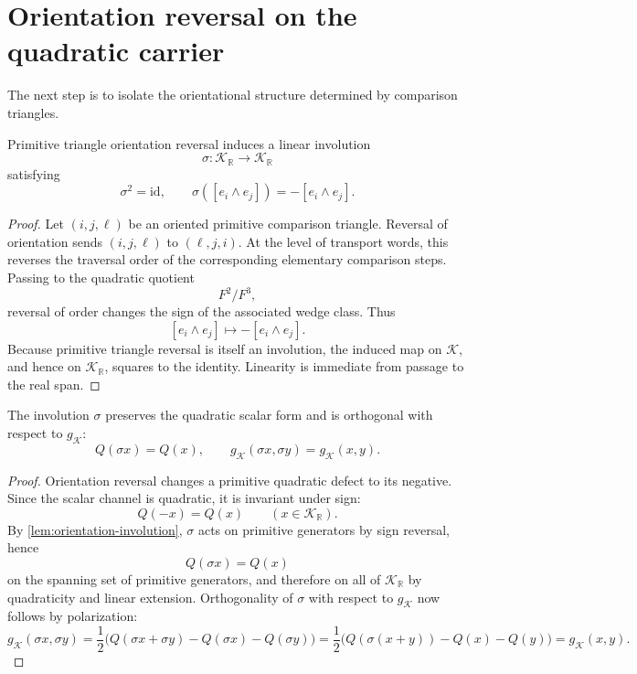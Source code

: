 \section{Orientation reversal on the quadratic carrier}
\label{sec:hilbert-orientation}
The next step is to isolate the orientational structure determined by
comparison triangles.
\begin{lemma}
	\label{lem:orientation-involution}
	Primitive triangle orientation reversal induces a linear involution
	\[
		\sigma:\mathcal K_{\mathbb R}\to\mathcal K_{\mathbb R}
	\]
	satisfying
	\[
		\sigma^{2}=\mathrm{id},
		\qquad
		\sigma([e_i\wedge e_j])=-[e_i\wedge e_j].
	\]
\end{lemma}
\begin{proof}
	Let \((i,j,\ell)\) be an oriented primitive comparison triangle.
	Reversal of orientation sends \((i,j,\ell)\) to \((\ell,j,i)\).
	At the level of transport words, this reverses the traversal order of
	the corresponding elementary comparison steps.
	Passing to the quadratic quotient
	\[
		F^{2}/F^{3},
	\]
	reversal of order changes the sign of the associated wedge class.
	Thus
	\[
		[e_i\wedge e_j]\longmapsto -[e_i\wedge e_j].
	\]
	Because primitive triangle reversal is itself an involution, the induced
	map on \(\mathcal K\), and hence on \(\mathcal K_{\mathbb R}\), squares
	to the identity.
	Linearity is immediate from passage to the real span.
\end{proof}
\begin{lemma}
	\label{lem:orientation-orthogonal}
	The involution \(\sigma\) preserves the quadratic scalar form and is
	orthogonal with respect to \(g_{\mathcal K}\):
	\[
		Q(\sigma x)=Q(x),
		\qquad
		g_{\mathcal K}(\sigma x,\sigma y)=g_{\mathcal K}(x,y).
	\]
\end{lemma}
\begin{proof}
	Orientation reversal changes a primitive quadratic defect to its
	negative.
	Since the scalar channel is quadratic, it is invariant under sign:
	\[
		Q(-x)=Q(x)
		\qquad
		(x\in\mathcal K_{\mathbb R}).
	\]
	By \cref{lem:orientation-involution}, \(\sigma\) acts on primitive
	generators by sign reversal, hence
	\[
		Q(\sigma x)=Q(x)
	\]
	on the spanning set of primitive generators, and therefore on all of
	\(\mathcal K_{\mathbb R}\) by quadraticity and linear extension.
	Orthogonality of \(\sigma\) with respect to \(g_{\mathcal K}\) now
	follows by polarization:
	\[
		g_{\mathcal K}(\sigma x,\sigma y)
		=
		\frac12\bigl(Q(\sigma x+\sigma y)-Q(\sigma x)-Q(\sigma y)\bigr)
		=
		\frac12\bigl(Q(\sigma(x+y))-Q(x)-Q(y)\bigr)
		=
		g_{\mathcal K}(x,y).
	\]
\end{proof}
